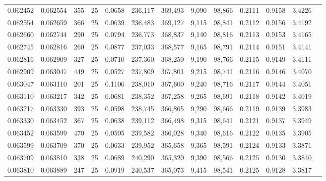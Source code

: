 \begin{tabular}{rrrrrrrrrrrrr}
0.062452 & 0.062554 &   355 &  25 &                                     0.0658 & 236,117 & 369,493 &   9,090 &  98,866 & 0.2111 & 0.9158 & 3.4226 \\
0.062554 & 0.062659 &   366 &  25 &                                     0.0639 & 236,483 & 369,127 &   9,115 &  98,841 & 0.2112 & 0.9156 & 3.4192 \\
0.062660 & 0.062744 &   290 &  25 &                                     0.0794 & 236,773 & 368,837 &   9,140 &  98,816 & 0.2113 & 0.9153 & 3.4165 \\
0.062745 & 0.062816 &   260 &  25 &                                     0.0877 & 237,033 & 368,577 &   9,165 &  98,791 & 0.2114 & 0.9151 & 3.4141 \\
0.062816 & 0.062909 &   327 &  25 &                                     0.0710 & 237,360 & 368,250 &   9,190 &  98,766 & 0.2115 & 0.9149 & 3.4111 \\
0.062909 & 0.063047 &   449 &  25 &                                     0.0527 & 237,809 & 367,801 &   9,215 &  98,741 & 0.2116 & 0.9146 & 3.4070 \\
0.063047 & 0.063110 &   201 &  25 &                                     0.1106 & 238,010 & 367,600 &   9,240 &  98,716 & 0.2117 & 0.9144 & 3.4051 \\
0.063110 & 0.063217 &   342 &  25 &                                     0.0681 & 238,352 & 367,258 &   9,265 &  98,691 & 0.2118 & 0.9142 & 3.4019 \\
0.063217 & 0.063330 &   393 &  25 &                                     0.0598 & 238,745 & 366,865 &   9,290 &  98,666 & 0.2119 & 0.9139 & 3.3983 \\
0.063330 & 0.063452 &   367 &  25 &                                     0.0638 & 239,112 & 366,498 &   9,315 &  98,641 & 0.2121 & 0.9137 & 3.3949 \\
0.063452 & 0.063599 &   470 &  25 &                                     0.0505 & 239,582 & 366,028 &   9,340 &  98,616 & 0.2122 & 0.9135 & 3.3905 \\
0.063599 & 0.063709 &   370 &  25 &                                     0.0633 & 239,952 & 365,658 &   9,365 &  98,591 & 0.2124 & 0.9133 & 3.3871 \\
0.063709 & 0.063810 &   338 &  25 &                                     0.0689 & 240,290 & 365,320 &   9,390 &  98,566 & 0.2125 & 0.9130 & 3.3840 \\
0.063810 & 0.063889 &   247 &  25 &                                     0.0919 & 240,537 & 365,073 &   9,415 &  98,541 & 0.2125 & 0.9128 & 3.3817 \\

\end{tabular}
